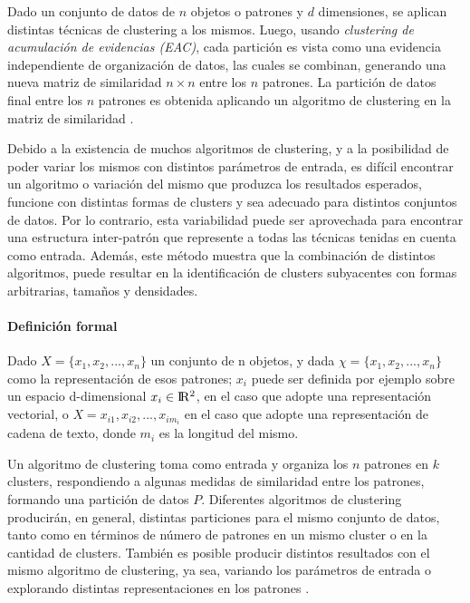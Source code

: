 \bigskip Dado un conjunto de datos de \(n\) objetos o patrones y \(d\) dimensiones, se aplican distintas técnicas de clustering a los mismos. Luego, usando \textit{clustering de acumulación de evidencias (EAC)}, cada partición es vista como una evidencia independiente de organización de datos, las cuales se combinan, generando una nueva matriz de similaridad  \(n \times n\) entre los \(n\) patrones. La partición de datos final entre los \(n\) patrones es obtenida aplicando un algoritmo de clustering en la matriz de similaridad \citep{fred2005combining}.

\bigskip Debido a la existencia de muchos algoritmos de clustering, y a la posibilidad de poder variar los mismos con distintos parámetros de entrada, es difícil encontrar un algoritmo o variación del mismo que produzca los resultados esperados, funcione con distintas formas de clusters y sea adecuado para distintos conjuntos de datos. Por lo contrario, esta variabilidad puede ser aprovechada para encontrar una estructura inter-patrón que represente a todas las técnicas tenidas en cuenta como entrada. Además, este método muestra que la combinación de distintos algoritmos, puede resultar en la identificación de clusters subyacentes con formas arbitrarias, tamaños y densidades.

\paragraph{Definición formal}
Dado \(X = \{x_1, x_2,... , x_n\}\) un conjunto de n objetos, y dada \(\chi = \{x_1, x_2,... , x_n\}\) como la representación de esos patrones; \(x_i\) puede ser definida por ejemplo sobre un espacio d-dimensional \(x_i \in \rm I\!R^2\), en el caso que adopte una representación vectorial, o \(X = x_{i1}, x_{i2},... , x_{im_i}\) en el caso que adopte una representación de cadena de texto, donde \(m_i\) es la longitud del mismo.

Un algoritmo de clustering toma  como entrada y organiza los \(n\) patrones en \(k\) clusters, respondiendo a algunas medidas de similaridad entre los patrones, formando una partición de datos \(P\). Diferentes algoritmos de clustering producirán, en general, distintas particiones para el mismo conjunto de datos, tanto como en términos de número de patrones en un mismo cluster o en la cantidad de clusters. También es posible producir distintos resultados con el mismo algoritmo de clustering, ya sea, variando los parámetros de entrada o explorando distintas representaciones en los patrones \citep{fred2005combining}.

